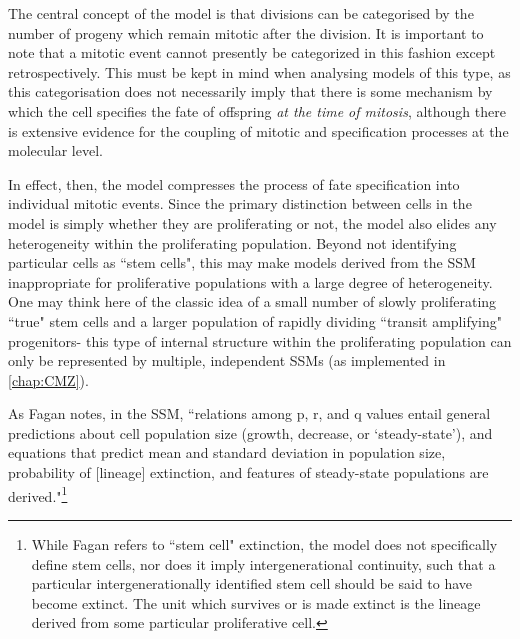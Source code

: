 The central concept of the model is that divisions can be categorised by the number of progeny which remain mitotic after the division. It is important to note that a mitotic event cannot presently be categorized in this fashion except retrospectively. This must be kept in mind when analysing models of this type, as this categorisation does not necessarily imply that there is some mechanism by which the cell specifies the fate of offspring \textit{at the time of mitosis}, although there is extensive evidence for the coupling of mitotic and specification processes at the molecular level.

In effect, then, the model compresses the process of fate specification into individual mitotic events. Since the primary distinction between cells in the model is simply whether they are proliferating or not, the model also elides any heterogeneity within the proliferating population. Beyond not identifying particular cells as ``stem cells", this may make models derived from the SSM inappropriate for proliferative populations with a large degree of heterogeneity. One may think here of the classic idea of a small number of slowly proliferating ``true" stem cells and a larger population of rapidly dividing ``transit amplifying" progenitors- this type of internal structure within the proliferating population can only be represented by multiple, independent SSMs (as implemented in \autoref{chap:CMZ}).

As Fagan notes, in the SSM, ``relations among p, r, and q values entail general predictions about cell population size (growth, decrease, or ‘steady-state’), and equations that predict mean and standard deviation in population size, probability of [lineage] extinction, and features of steady-state populations are derived."\footnote{While Fagan refers to ``stem cell" extinction, the model does not specifically define stem cells, nor does it imply intergenerational continuity, such that a particular intergenerationally identified stem cell should be said to have become extinct. The unit which survives or is made extinct is the lineage derived from some particular proliferative cell.}\cite[p.60]{Fagan2013}

